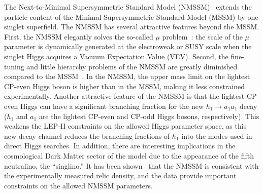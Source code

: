 \documentclass[aps,prl,twocolumn,nofootinbib,superscriptaddress]{revtex4}
\begin{document}
The Next-to-Minimal Supersymmetric Standard Model
(NMSSM)~\cite{Nilles:1982dy,Frere:1983ag,Ellis:1988er,Drees:1988fc,Ellwanger:1993hn,Ellwanger:1993xa,Elliott:1993bs,Pandita:1993tg,Ellwanger:1995ru,King:1995vk,Franke:1995tc,Ellwanger:1996gw,Miller:2003ay}
extends the particle content of the Minimal Supersymmetric Standard
Model (MSSM) by one singlet superfield.  The NMSSM has several
attractive features beyond the MSSM.  First, the NMSSM elegantly
solves the so-called $\mu$ problem~\cite{mu-problem}: the scale of the
$\mu$ parameter is dynamically generated at the electroweak or SUSY
scale when the singlet Higgs acquires a Vacuum Expectation Value
(VEV).  Second, the fine-tuning and little hierarchy problems of the
NMSSM are greatly diminished compared to the
MSSM~\cite{Dermisek:2005ar}.  In the NMSSM, the upper mass limit on
the lightest CP-even Higgs boson is higher than in the MSSM, making it
less constrained experimentally.  Another attractive feature of the
NMSSM is that the lightest CP-even Higgs can have a significant
branching fraction for the new $h_1 \to a_1 a_1$ decay ($h_1$ and
$a_1$ are the lightest CP-even and CP-odd Higgs bosons, respectively).
This weakens the LEP-II constraints on the allowed Higgs parameter
space, as this new decay channel reduces the branching fractions of
$h_1$ into the modes used in direct Higgs searches.  In addition,
there are interesting implications in the cosmological Dark Matter
sector of the model due to the appearance of the fifth neutralino, the
``singlino.''  It has been shown~\cite{nmssm-dm} that the NMSSM is
consistent with the experimentally measured relic density, and the
data provide important constraints on the allowed NMSSM parameters.
\end{document}

